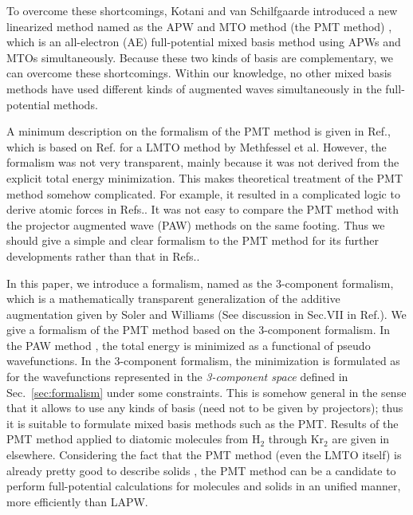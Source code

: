 \documentclass[a4paper,10pt,aip,onecolumn,amsmath,amssymb,floatfix,rmp]{revtex4-1}
\newcommand{\refsec}[1]{\mbox{Sec.~\!\ref{#1}}}
\begin{document}
To overcome these shortcomings, 
Kotani and van Schilfgaarde introduced a new linearized method 
named as the APW and MTO method (the PMT method) \cite{pmt1}, which is an all-electron (AE) 
full-potential mixed basis method using APWs and MTOs simultaneously.
Because these two kinds of basis are complementary, 
we can overcome these shortcomings. Within our knowledge, 
no other mixed basis methods have used different kinds 
of augmented waves simultaneously in the full-potential methods.

A minimum description on the formalism of the PMT method is given in Ref.\cite{pmt1}, 
which is based on Ref. for a LMTO method  
by Methfessel et al. However, the formalism was not very transparent, 
mainly because it was not derived from the explicit total energy minimization.
This makes theoretical treatment of the PMT method somehow complicated.
For example, it resulted in a complicated logic to derive atomic forces 
in Refs.. 
It was not easy to compare the PMT method with the projector augmented
wave (PAW) methods \cite{PAW,kresse99} on the same footing.
Thus we should give a simple and clear formalism to the PMT method 
for its further developments rather than that in Refs..

In this paper, we introduce a formalism, named as the 3-component
formalism, which is a mathematically transparent generalization of the additive
augmentation given by Soler and Williams \cite{soler89,soler90,soler93} 
(See discussion in Sec.VII in Ref.\cite{PAW}).
We give a formalism of the PMT method based on the 3-component formalism.
In the PAW method \cite{PAW}, the total energy is minimized as a
functional of pseudo wavefunctions. In the 3-component formalism,
the minimization is formulated as for the wavefunctions represented in the 
{\it 3-component space} defined in \refsec{sec:formalism} under some constraints.
This is somehow general in the sense that it allows to use any kinds of basis 
(need not to be given by projectors); thus it is
suitable to formulate mixed basis methods such as the PMT.
Results of the PMT method applied to diatomic molecules from H$_2$ through Kr$_2$ 
are given in elsewhere. Considering the fact
that the PMT method (even the LMTO itself) is already pretty good to
describe solids \cite{pmt1,lmfchap,kotani07a,mark06adeq},
the PMT method can be a candidate to perform full-potential
calculations for molecules and solids in an unified manner, 
more efficiently than LAPW.
\end{document}
